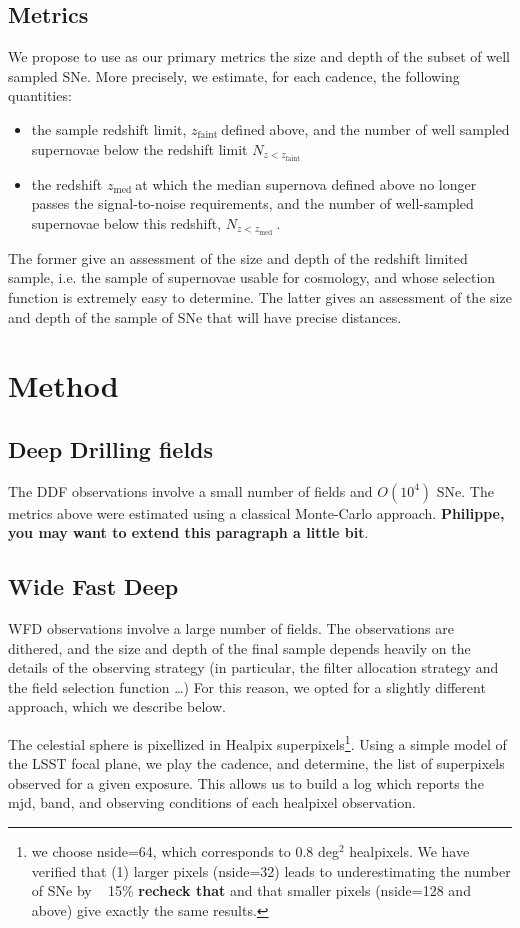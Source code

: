 \documentclass [11pt,a4paper]{article}
\newcommand{\zfaint}{$z_{\mathrm{faint}}\ $}
\newcommand{\nsnfaint}{$N_{z<z_{\mathrm{faint}}}\ $}
\newcommand{\zmed}{$z_{\mathrm{med}}\ $}
\newcommand{\nsnmed}{$N_{z<z_{\mathrm{med}}}\ $}
\newcommand{\FixMe}[1]{{\color{red} \bf \large #1}}
\begin{document}
\subsection{Metrics}

We propose to use as our primary metrics the size and depth of the
subset of well sampled SNe.  More precisely, we estimate, for each
cadence, the following quantities:

\begin{itemize}
\item the sample redshift limit, \zfaint defined above, and the number
  of well sampled supernovae below the redshift limit \nsnfaint
\item the redshift \zmed at which the median supernova defined above
  no longer passes the signal-to-noise requirements, and the number of
  well-sampled supernovae below this redshift, \nsnmed.  
\end{itemize}
The former give an assessment of the size and depth of the redshift
limited sample, i.e. the sample of supernovae usable for cosmology,
and whose selection function is extremely easy to determine.  The
latter gives an assessment of the size and depth of the sample of SNe
that will have precise distances.


\section{Method}

\subsection{Deep Drilling fields}
The DDF  observations involve a  small number of fields  and $O(10^4)$
SNe.  The metrics  above were estimated using  a classical Monte-Carlo
approach. \FixMe{Philippe,  you may  want to  extend this  paragraph a
  little bit}.

\subsection{Wide Fast Deep}
WFD observations involve a large number of fields.  The observations
are dithered, and the size and depth of the final sample depends
heavily on the details of the observing strategy (in particular, the
filter allocation strategy and the field selection function \ldots)
For this reason, we opted for a slightly different approach, which we
describe below.

The celestial sphere is pixellized in Healpix superpixels\footnote{we
  choose nside=64, which corresponds to 0.8 deg$^2$ healpixels.  We
  have verified that (1) larger pixels (nside=32) leads to
  underestimating the number of SNe by ~ 15\% \FixMe{recheck that} and
  that smaller pixels (nside=128 and above) give exactly the same
  results.}.  Using a simple model of the LSST focal plane, we play
the cadence, and determine, the list of superpixels observed for a
given exposure. This allows us to build a log which reports the mjd,
band, and observing conditions of each healpixel observation.
\end{document}
